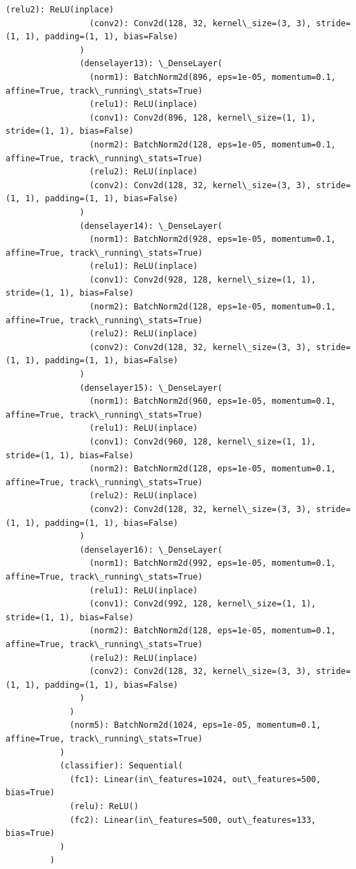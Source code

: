\documentclass[11pt]{article}
\begin{document}
\begin{Verbatim}[commandchars=\\\{\}]
                 (relu2): ReLU(inplace)
                 (conv2): Conv2d(128, 32, kernel\_size=(3, 3), stride=(1, 1), padding=(1, 1), bias=False)
               )
               (denselayer13): \_DenseLayer(
                 (norm1): BatchNorm2d(896, eps=1e-05, momentum=0.1, affine=True, track\_running\_stats=True)
                 (relu1): ReLU(inplace)
                 (conv1): Conv2d(896, 128, kernel\_size=(1, 1), stride=(1, 1), bias=False)
                 (norm2): BatchNorm2d(128, eps=1e-05, momentum=0.1, affine=True, track\_running\_stats=True)
                 (relu2): ReLU(inplace)
                 (conv2): Conv2d(128, 32, kernel\_size=(3, 3), stride=(1, 1), padding=(1, 1), bias=False)
               )
               (denselayer14): \_DenseLayer(
                 (norm1): BatchNorm2d(928, eps=1e-05, momentum=0.1, affine=True, track\_running\_stats=True)
                 (relu1): ReLU(inplace)
                 (conv1): Conv2d(928, 128, kernel\_size=(1, 1), stride=(1, 1), bias=False)
                 (norm2): BatchNorm2d(128, eps=1e-05, momentum=0.1, affine=True, track\_running\_stats=True)
                 (relu2): ReLU(inplace)
                 (conv2): Conv2d(128, 32, kernel\_size=(3, 3), stride=(1, 1), padding=(1, 1), bias=False)
               )
               (denselayer15): \_DenseLayer(
                 (norm1): BatchNorm2d(960, eps=1e-05, momentum=0.1, affine=True, track\_running\_stats=True)
                 (relu1): ReLU(inplace)
                 (conv1): Conv2d(960, 128, kernel\_size=(1, 1), stride=(1, 1), bias=False)
                 (norm2): BatchNorm2d(128, eps=1e-05, momentum=0.1, affine=True, track\_running\_stats=True)
                 (relu2): ReLU(inplace)
                 (conv2): Conv2d(128, 32, kernel\_size=(3, 3), stride=(1, 1), padding=(1, 1), bias=False)
               )
               (denselayer16): \_DenseLayer(
                 (norm1): BatchNorm2d(992, eps=1e-05, momentum=0.1, affine=True, track\_running\_stats=True)
                 (relu1): ReLU(inplace)
                 (conv1): Conv2d(992, 128, kernel\_size=(1, 1), stride=(1, 1), bias=False)
                 (norm2): BatchNorm2d(128, eps=1e-05, momentum=0.1, affine=True, track\_running\_stats=True)
                 (relu2): ReLU(inplace)
                 (conv2): Conv2d(128, 32, kernel\_size=(3, 3), stride=(1, 1), padding=(1, 1), bias=False)
               )
             )
             (norm5): BatchNorm2d(1024, eps=1e-05, momentum=0.1, affine=True, track\_running\_stats=True)
           )
           (classifier): Sequential(
             (fc1): Linear(in\_features=1024, out\_features=500, bias=True)
             (relu): ReLU()
             (fc2): Linear(in\_features=500, out\_features=133, bias=True)
           )
         )
\end{Verbatim}
            
\end{document}
